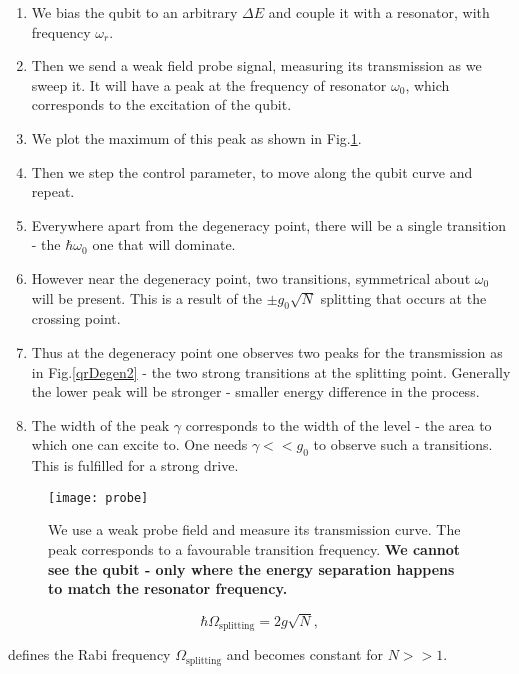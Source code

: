 \begin{enumerate}
\item  We bias  the qubit  to an  arbitrary $  \Delta E  $ and  couple it  with a
  resonator, with frequency $ \omega_r $.
\item Then we  send a weak field  probe signal, measuring its  transmission as we
  sweep it.   It will have  a peak  at the frequency  of resonator $  \omega_0 $,
  which corresponds to the excitation of the qubit.
\item We plot the maximum of this peak as shown in Fig.\ref{qrProbe}.
\item Then  we step  the control  parameter, to  move along  the qubit  curve and
  repeat.
\item  Everywhere  apart from  the  degeneracy  point,  there  will be  a  single
  transition - the $ \hbar\omega_0 $ one that will dominate.
\item  However near  the  degeneracy point,  two  transitions, symmetrical  about
  $ \omega_0  $ will be  present.  This is  a result of  the $ \pm  g_0\sqrt{N} $
  splitting that occurs at the crossing point.
\item Thus at the degeneracy point one observes two peaks for the transmission as
  in  Fig.\ref{qrDegen2} -  the two  strong transitions  at the  splitting point.
  Generally the  lower peak will be  stronger - smaller energy  difference in the
  process.
\item The width  of the peak $ \gamma  $ corresponds to the width of  the level -
  the area to which one can excite to.  One needs $ \gamma<<g_0 $ to observe such
  a transitions.  This is fulfilled for a strong drive.
\end{enumerate}

\begin{figure}
  \centering \texttt{[image: probe]}
  \caption{We use  a weak probe  field and  measure its transmission  curve.  The
    peak corresponds to a favourable transition frequency.  \textbf{We cannot see
      the qubit - only where the energy separation happens to match the resonator
      frequency.}\label{qrProbe}}
\end{figure}

\begin{framed}\noindent
  \begin{equation}
    \hbar\Omega_\text{splitting}            =
    2g\sqrt{N},
  \end{equation}

  \noindent defines  the Rabi frequency  $ \Omega_\text{splitting} $  and becomes
  constant for $N>>1$.
\end{framed}

